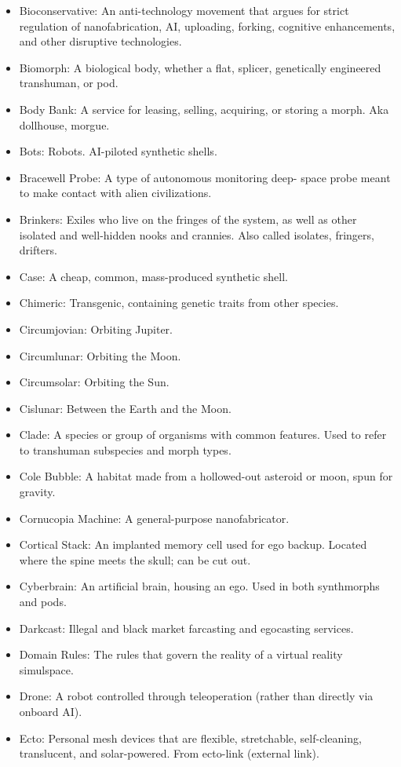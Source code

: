 \begin{itemize}
\item Bioconservative: An anti-technology movement that argues for  strict regulation of nanofabrication, AI, uploading, forking,  cognitive enhancements, and other disruptive technologies.
\item Biomorph: A biological body, whether a flat, splicer,  genetically engineered transhuman, or pod.
\item Body Bank: A service for leasing, selling, acquiring, or storing  a morph. Aka dollhouse, morgue.
\item Bots: Robots. AI-piloted synthetic shells.
\item Bracewell Probe: A type of autonomous monitoring deep- space  probe meant to make contact with alien civilizations.
\item Brinkers: Exiles who live on the fringes of the system, as well  as other isolated and well-hidden nooks and crannies. Also called  isolates, fringers, drifters.
\item Case: A cheap, common, mass-produced synthetic shell.
\item Chimeric: Transgenic, containing genetic traits from other  species.
\item Circumjovian: Orbiting Jupiter.
\item Circumlunar: Orbiting the Moon.
\item Circumsolar: Orbiting the Sun.
\item Cislunar: Between the Earth and the Moon.
\item Clade: A species or group of organisms with common  features. Used to refer to transhuman subspecies and morph types.
\item Cole Bubble: A habitat made from a hollowed-out asteroid or  moon, spun for gravity.
\item Cornucopia Machine: A general-purpose nanofabricator.
\item Cortical Stack: An implanted memory cell used for ego  backup. Located where the spine meets the skull; can be cut out.
\item Cyberbrain: An artificial brain, housing an ego. Used in both  synthmorphs and pods.
\item Darkcast: Illegal and black market farcasting and egocasting  services.
\item Domain Rules: The rules that govern the reality of a virtual  reality simulspace.
\item Drone: A robot controlled through teleoperation (rather than  directly via onboard AI).
\item Ecto: Personal mesh devices that are flexible, stretchable,  self-cleaning, translucent, and solar-powered. From ecto-link  (external link).

\end{itemize}
